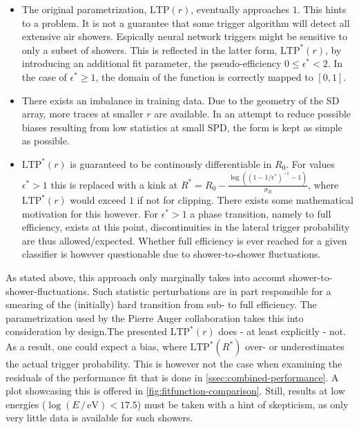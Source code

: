 \begin{itemize}
	\item The original parametrization, $\text{LTP}(r)$, eventually approaches $1$. This hints to a problem. It is not a guarantee that some trigger algorithm will
	detect all extensive air showers. Espically neural network triggers  might be sensitive to only a subset of showers. This is reflected in the latter form, 
	$\text{LTP}^*(r)$, by introducing an additional fit parameter, the pseudo-efficiency $0\leq\epsilon^*<2$. In the case of $\epsilon^*\geq1$, the domain of the 
	function is correctly mapped to $[0, 1]$.

	\item There exists an imbalance in training data. Due to the geometry of the SD array, more traces at smaller $r$ are available. In an attempt to reduce 
	possible biases resulting from low statistics at small SPD, the form is kept as simple as possible.

	\item $\text{LTP}^*(r)$ is guaranteed to be continously differentiable in $R_0$. For values $\epsilon^* > 1$ this is replaced with a kink at 
	$R^* = R_0 - \frac{\log\left(\left(1 - 1/\epsilon^*\right)^{-1}-1\right)}{\sigma_R}$, where $\text{LTP}^*(r)$ would exceed $1$ if not for clipping. There 
	exists some mathematical motivation for this however. For $\epsilon^* > 1$ a phase transition, namely to full efficiency, exists at this point, discontinuities 
	in the lateral trigger probability are thus allowed/expected. Whether full efficiency is ever reached for a given classifier is however questionable due to 
	shower-to-shower fluctuations.
\end{itemize}

As stated above, this approach only marginally takes into account shower-to-shower-fluctuations. Such statistic perturbations are in part responsible for a 
smearing of the (initially) hard transition from sub- to full efficiency. The parametrization used by the Pierre Auger collaboration takes this into consideration 
by design.The presented $\text{LTP}^*(r)$ does - at least explicitly - not. As a result, one could expect a bias, where $\text{LTP}^*(R^*)$ over- or underestimates
the actual trigger probability. This is however not the case when examining the residuals of the performance fit that is done in 
\autoref{ssec:combined-performance}. A plot showcasing this is offered in \autoref{fig:fitfunction-comparison}. Still, results at low energies 
($\log(E\,/\,\mathrm{eV}) < 17.5$) must be taken with a hint of skepticism, as only very little data is available for such showers.

